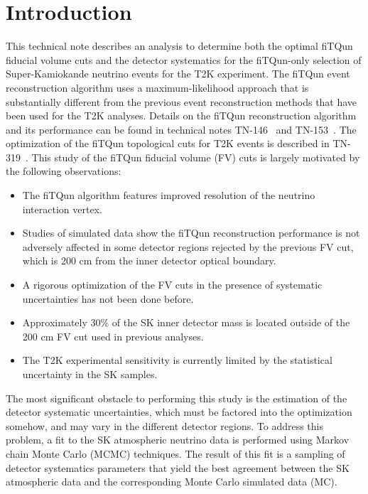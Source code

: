 
\section{Introduction}
\label{subsec:intro}

This technical note describes an analysis to determine both the optimal fiTQun
fiducial volume cuts and the detector systematics for the fiTQun-only selection
of Super-Kamiokande neutrino events for the T2K experiment.  The fiTQun event
reconstruction algorithm uses a maximum-likelihood approach that is
substantially different from the previous event reconstruction methods that
have been used for the T2K analyses.  Details on the fiTQun reconstruction
algorithm and its performance can be found in technical notes
TN-146~\cite{tn146} and TN-153~\cite{tn153}.  The optimization of the fiTQun
topological cuts for  T2K events is described in TN-319~\cite{tn319}.  This
study of the fiTQun fiducial volume (FV) cuts is largely motivated by the
following observations:

\begin{itemize}
  \item The fiTQun algorithm features improved resolution of the neutrino interaction vertex.
  \item Studies of simulated data show the fiTQun reconstruction performance is not adversely affected
    in some detector regions rejected by the previous FV cut, which is 200 cm from the inner detector
    optical boundary.
  \item A rigorous optimization of the FV cuts in the presence of systematic uncertainties 
    has not been done before.
  \item Approximately 30\% of the SK inner detector mass is located outside of the 200 cm FV cut used in previous analyses.
  \item The T2K experimental sensitivity is currently limited by the statistical uncertainty in the SK samples.
\end{itemize}

The most significant obstacle to performing this study is the
estimation of the detector systematic uncertainties, which must be factored
into the optimization somehow, and may vary in the different detector regions.
To address this problem, a fit to the SK
atmospheric neutrino data is performed using Markov chain Monte Carlo (MCMC)
techniques.  The result of this fit is a sampling of detector systematics
parameters that yield the best agreement between the SK atmospheric data and
the corresponding Monte Carlo simulated data (MC).

